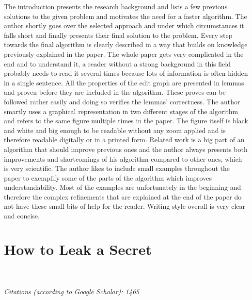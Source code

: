 \documentclass{scrartcl}
\begin{document}
The introduction presents the research background and lists a few
previous solutions to the given problem and motivates the need for a
faster algorithm. The author shortly goes over the selected approach and
under which circumstances it falls short and finally presents their
final solution to the problem. Every step towards the final algorithm is
clearly described in a way that builds on knowledge previously explained
in the paper. The whole paper gets very complicated in the end and to
understand it, a reader without a strong background in this field probably
needs to read it several times because lots of information is often
hidden in a single sentence. All the properties of the edit graph are
presented in lemmas and proven before they are included in the
algorithm. These proves can be followed rather easily and doing so
verifies the lemmas' correctness. The author smartly uses a graphical
representation in two different stages of the algorithm and refers to
the same figure multiple times in the paper. The figure itself is black
and white and big enough to be readable without any zoom applied and is
therefore readable digitally or in a printed form. Related work is a big
part of an algorithm that should improve previous ones and the author
always presents both improvements and shortcomings of his algorithm
compared to other ones, which is very scientific. The author likes to
include small examples throughout the paper to exemplify some of the
parts of the algorithm which improves understandability. Most of the
examples are unfortunately in the beginning and therefore the complex
refinements that are explained at the end of the paper do not have these
small bits of help for the reader. 
Writing style overall is very clear
and concise.





\section{How to Leak a Secret}
\\\\
\emph{Citations (according to Google Scholar): 1465}
\end{document}
